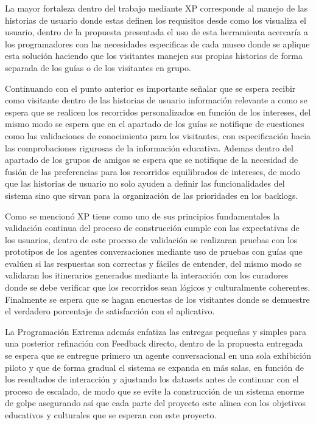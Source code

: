 \documentclass[pdflatex,sn-mathphys-num]{sn-jnl}%
\theoremstyle{thmstyleone}%
\theoremstyle{thmstyletwo}%
\theoremstyle{thmstylethree}%
\begin{document}
La mayor fortaleza dentro del trabajo mediante XP corresponde al manejo de las historias de usuario donde estas definen los requisitos desde como los visualiza el usuario, dentro de la propuesta presentada el uso de esta herramienta acercaría a los programadores con las necesidades especificas de cada museo donde se aplique esta solución haciendo que los visitantes manejen sus propias historias de forma separada de los guías o de los visitantes en grupo.

Continuando con el punto anterior es importante señalar que se espera recibir como visitante dentro de las historias de usuario información relevante a como se espera que se realicen los recorridos personalizados en función de los intereses, del mismo modo se espera que en el apartado de los guías se notifique de cuestiones como las validaciones de conocimiento para los visitantes, con especificación hacia las comprobaciones rigurosas de la información educativa. Ademas dentro del apartado de los grupos de amigos se espera que se notifique de la necesidad de fusión de las preferencias para los recorridos equilibrados de intereses, de modo que las historias de usuario no solo ayuden a definir las funcionalidades del sistema sino que sirvan para la organización de las prioridades en los backlogs.

Como se mencionó XP tiene como uno de sus principios fundamentales la validación continua del proceso de construcción cumple con las expectativas de los usuarios, dentro de este proceso de validación se realizaran pruebas con los prototipos de los agentes conversaciones mediante uso de pruebas con guías que evalúen si las respuestas son correctas y fáciles de entender, del mismo modo se validaran los itinerarios generados mediante la interacción con los curadores donde se debe verificar que los recorridos sean lógicos y culturalmente coherentes. Finalmente se espera que se hagan encuestas de los visitantes donde se demuestre el verdadero porcentaje de satisfacción con el aplicativo.

La Programación Extrema además enfatiza las entregas pequeñas y simples para una posterior refinación con Feedback directo, dentro de la propuesta entregada se espera que se entregue primero un agente conversacional en una sola exhibición piloto y que de forma gradual el sistema se expanda en más salas, en función de los resultados de interacción y ajustando los datasets antes de continuar con el proceso de escalado, de modo que se evite la construcción de un sistema enorme de golpe asegurando así que cada parte del proyecto este alinea con los objetivos educativos y culturales que se esperan con este proyecto.
\end{document}

